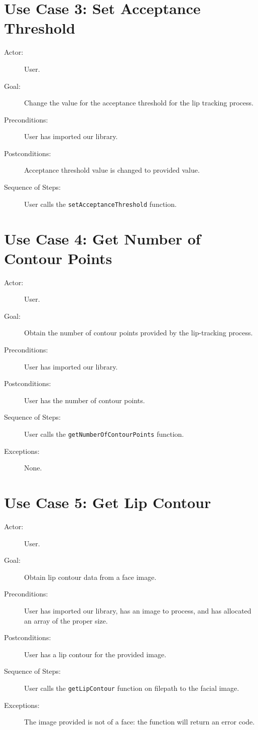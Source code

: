 \section{Use Case 3: Set Acceptance Threshold}

\begin{description}
	\item[Actor:] User.
	\item[Goal:] Change the value for the acceptance threshold for the lip tracking process.
	\item[Preconditions:] User has imported our library.
	\item[Postconditions:] Acceptance threshold value is changed to provided value.
	\item[Sequence of Steps:] User calls the \texttt{setAcceptanceThreshold} function.
\end{description}

\section{Use Case 4: Get Number of Contour Points}

\begin{description}
	\item[Actor:] User.
	\item[Goal:] Obtain the number of contour points provided by the lip-tracking process.
	\item[Preconditions:] User has imported our library.
	\item[Postconditions:] User has the number of contour points.
	\item[Sequence of Steps:] User calls the \texttt{getNumberOfContourPoints} function.
	\item[Exceptions:] None.
\end{description}

\section{Use Case 5: Get Lip Contour}

\begin{description}
	\item[Actor:] User.
	\item[Goal:] Obtain lip contour data from a face image.
	\item[Preconditions:] User has imported our library, has an image to process, and has allocated an array of the proper size.
	\item[Postconditions:] User has a lip contour for the provided image.
	\item[Sequence of Steps:] User calls the \texttt{getLipContour} function on filepath to the facial image.
	\item[Exceptions:] The image provided is not of a face: the function will return an error code.
\end{description}

